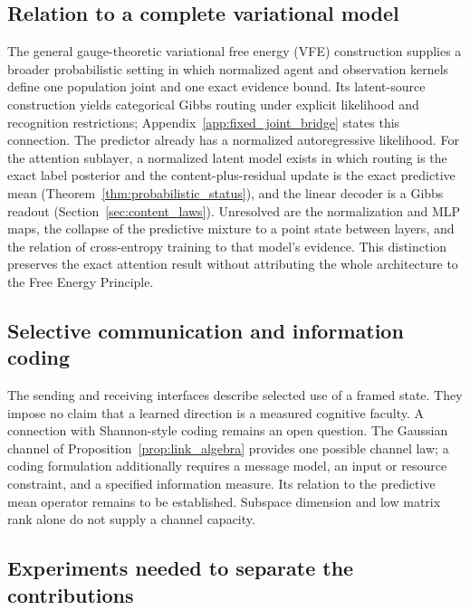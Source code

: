 \documentclass[twoside,11pt]{article}
\begin{document}
\subsection{Relation to a complete variational model}
The general gauge-theoretic variational free energy (VFE) construction supplies a broader probabilistic setting in which normalized agent and observation kernels define one population joint and one exact evidence bound. Its latent-source construction yields categorical Gibbs routing under explicit likelihood and recognition restrictions; Appendix~\ref{app:fixed_joint_bridge} states this connection. The predictor already has a normalized autoregressive likelihood. For the attention sublayer, a normalized latent model exists in which routing is the exact label posterior and the content-plus-residual update is the exact predictive mean (Theorem~\ref{thm:probabilistic_status}), and the linear decoder is a Gibbs readout (Section~\ref{sec:content_laws}). Unresolved are the normalization and MLP maps, the collapse of the predictive mixture to a point state between layers, and the relation of cross-entropy training to that model's evidence. This distinction preserves the exact attention result without attributing the whole architecture to the Free Energy Principle.

\subsection{Selective communication and information coding}
The sending and receiving interfaces describe selected use of a framed state. They impose no claim that a learned direction is a measured cognitive faculty. A connection with Shannon-style coding remains an open question. The Gaussian channel of Proposition~\ref{prop:link_algebra} provides one possible channel law; a coding formulation additionally requires a message model, an input or resource constraint, and a specified information measure. Its relation to the predictive mean operator remains to be established. Subspace dimension and low matrix rank alone do not supply a channel capacity.

\subsection{Experiments needed to separate the contributions}
\label{sec:needed_experiments}
\end{document}
